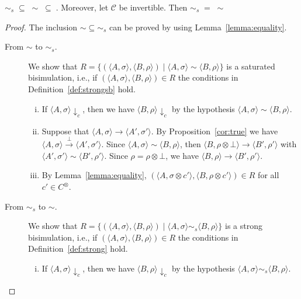 \documentclass[main.tex]{subfiles}
\begin{document}
\begin{theorem}\label{stronEq}
$\sim_{\mathit{s}} \; \subseteq \; \sim  \; \subseteq \;$. Moreover, let $\mathcal{C}$ be invertible.
Then $\sim_{\mathit{s}} \; = \; \sim$
\end{theorem}

\begin{proof}%
	The inclusion $\sim \subseteq \sim_{s}$ can be proved by using Lemma~\ref{lemma:equality}.
	\begin{description}
		\item[From $\sim$ to $\sim_{s}$.]
		We show that $R = \{ (\langle A, \sigma \rangle, \langle B, \rho \rangle) \mid  \langle A, \sigma\rangle \sim \langle B, \rho\rangle\}$
		is a saturated bisimulation, i.e.,
		if $(\langle A, \sigma \rangle, \langle B, \rho \rangle) \in R$ the conditions in Definition~\ref{def:strongsb} hold.
		\begin{enumerate}[i)]
			\item If $\langle A, \sigma \rangle \downarrow_c$, then we have $\langle B, \rho \rangle \downarrow_c$ by the hypothesis
			$\langle A, \sigma\rangle \sim \langle B, \rho\rangle$.
			\item Suppose that $\langle A, \sigma\rangle \rightarrow \langle A', \sigma' \rangle$. By Proposition~\ref{cor:true}
			we have $\langle A, \sigma\rangle \xrightarrow{\;  \bot \: } \langle A', \sigma' \rangle$.
			Since $\langle A, \sigma\rangle \sim \langle B, \rho\rangle$, then $\langle B, \rho \otimes \bot \rangle \rightarrow \langle B', \rho'\rangle$ with $\langle A', \sigma'\rangle \sim \langle B', \rho' \rangle$.
			Since $\rho = \rho \otimes \bot$, we have $\langle B, \rho  \rangle \rightarrow \langle B', \rho'\rangle$.
			\item By  Lemma~\ref{lemma:equality},
			$(\langle A, \sigma \otimes c'\rangle, \langle B, \rho \otimes c'\rangle) \in R$ for all $c' \in C^{\otimes}$.
		\end{enumerate}
		\item[From $\sim_{s}$ to $\sim$.]
		We show that $R = \{ (\langle A, \sigma \rangle, \langle B, \rho \rangle) \mid  \langle A, \sigma\rangle \sim_{s} \langle B, \rho\rangle\}$
		is a strong bisimulation, i.e., if $(\langle A, \sigma \rangle, \langle B, \rho \rangle) \in R$
		the conditions in Definition~\ref{def:strong} hold.
		\begin{enumerate}[i)]
			\item If $\langle A, \sigma \rangle \downarrow_c$, then we have $\langle B, \rho \rangle \downarrow_c$ by the hypothesis $\langle A, \sigma\rangle \sim_{s} \langle B, \rho\rangle$.

\end{enumerate}
\end{description}
\end{proof}
\end{document}
